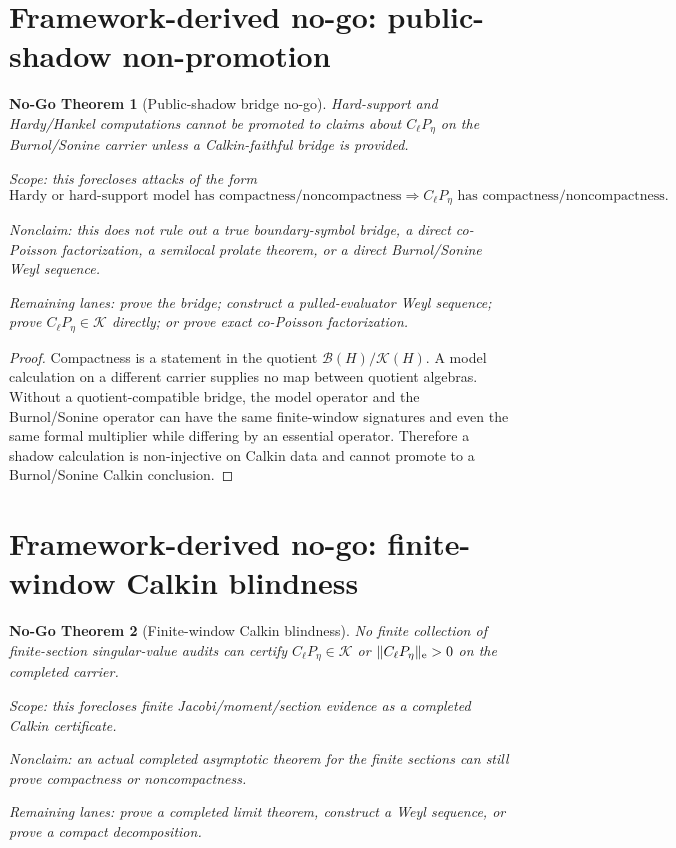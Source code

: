 \documentclass[11pt]{article}
\newtheorem{nogo}{No-Go Theorem}
\begin{document}
\section{Framework-derived no-go: public-shadow non-promotion}

\begin{nogo}[Public-shadow bridge no-go]
Hard-support and Hardy/Hankel computations cannot be promoted to claims about
\(C_\ell P_\eta\) on the Burnol/Sonine carrier unless a Calkin-faithful bridge is
provided.

Scope: this forecloses attacks of the form
\[
\text{Hardy or hard-support model has compactness/noncompactness}
\Rightarrow
C_\ell P_\eta\text{ has compactness/noncompactness}.
\]

Nonclaim: this does not rule out a true boundary-symbol bridge, a direct
co-Poisson factorization, a semilocal prolate theorem, or a direct Burnol/Sonine
Weyl sequence.

Remaining lanes: prove the bridge; construct a pulled-evaluator Weyl sequence;
prove \(C_\ell P_\eta\in\mathcal K\) directly; or prove exact co-Poisson
factorization.
\end{nogo}

\begin{proof}
Compactness is a statement in the quotient \(\mathcal B(H)/\mathcal K(H)\).  A
model calculation on a different carrier supplies no map between quotient
algebras.  Without a quotient-compatible bridge, the model operator and the
Burnol/Sonine operator can have the same finite-window signatures and even the
same formal multiplier while differing by an essential operator.  Therefore a
shadow calculation is non-injective on Calkin data and cannot promote to a
Burnol/Sonine Calkin conclusion.
\end{proof}

\section{Framework-derived no-go: finite-window Calkin blindness}

\begin{nogo}[Finite-window Calkin blindness]
No finite collection of finite-section singular-value audits can certify
\(C_\ell P_\eta\in\mathcal K\) or \(\|C_\ell P_\eta\|_{\rm e}>0\) on the completed
carrier.

Scope: this forecloses finite Jacobi/moment/section evidence as a completed
Calkin certificate.

Nonclaim: an actual completed asymptotic theorem for the finite sections can
still prove compactness or noncompactness.

Remaining lanes: prove a completed limit theorem, construct a Weyl sequence, or
prove a compact decomposition.
\end{nogo}
\end{document}
